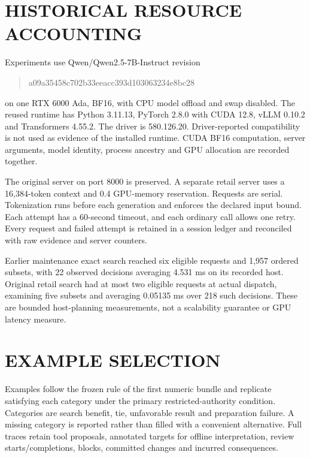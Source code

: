 

\section{HISTORICAL RESOURCE ACCOUNTING}
\noindent Experiments use Qwen/Qwen2.5-7B-Instruct revision
\begin{quote}\small\ttfamily
a09a35458c702b33eeacc393d103063234e8bc28
\end{quote}
on one RTX 6000 Ada, BF16, with CPU model offload and swap disabled. The reused runtime has Python 3.11.13, PyTorch 2.8.0 with CUDA 12.8, vLLM 0.10.2 and Transformers 4.55.2. The driver is 580.126.20. Driver-reported compatibility is not used as evidence of the installed runtime. CUDA BF16 computation, server arguments, model identity, process ancestry and GPU allocation are recorded together.\draftcredit

The original server on port 8000 is preserved. A separate retail server uses a 16,384-token context and 0.4 GPU-memory reservation. Requests are serial. Tokenization runs before each generation and enforces the declared input bound. Each attempt has a 60-second timeout, and each ordinary call allows one retry. Every request and failed attempt is retained in a session ledger and reconciled with raw evidence and server counters.

Earlier maintenance exact search reached six eligible requests and 1,957 ordered subsets, with 22 observed decisions averaging 4.531 ms on its recorded host. Original retail search had at most two eligible requests at actual dispatch, examining five subsets and averaging 0.05135 ms over 218 such decisions. These are bounded host-planning measurements, not a scalability guarantee or GPU latency measure.



\section{EXAMPLE SELECTION}
\noindent Examples follow the frozen rule of the first numeric bundle and replicate satisfying each category under the primary restricted-authority condition. Categories are search benefit, tie, unfavorable result and preparation failure. A missing category is reported rather than filled with a convenient alternative. Full traces retain tool proposals, annotated targets for offline interpretation, review starts/completions, blocks, committed changes and incurred consequences.\draftcredit

